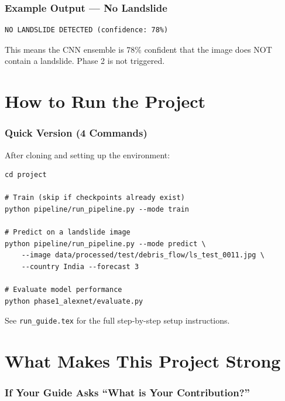 \documentclass[11pt]{article}
\begin{document}
\section{Example Output --- No Landslide}

\begin{verbatim}
NO LANDSLIDE DETECTED (confidence: 78%)
\end{verbatim}

This means the CNN ensemble is 78\% confident that the image does NOT contain a landslide. Phase 2 is not triggered.

\part{How to Run the Project}

\section{Quick Version (4 Commands)}

After cloning and setting up the environment:

\begin{verbatim}
cd project

# Train (skip if checkpoints already exist)
python pipeline/run_pipeline.py --mode train

# Predict on a landslide image
python pipeline/run_pipeline.py --mode predict \
    --image data/processed/test/debris_flow/ls_test_0011.jpg \
    --country India --forecast 3

# Evaluate model performance
python phase1_alexnet/evaluate.py
\end{verbatim}

See \texttt{run\_guide.tex} for the full step-by-step setup instructions.

\part{What Makes This Project Strong}

\section{If Your Guide Asks ``What is Your Contribution?''}
\end{document}
